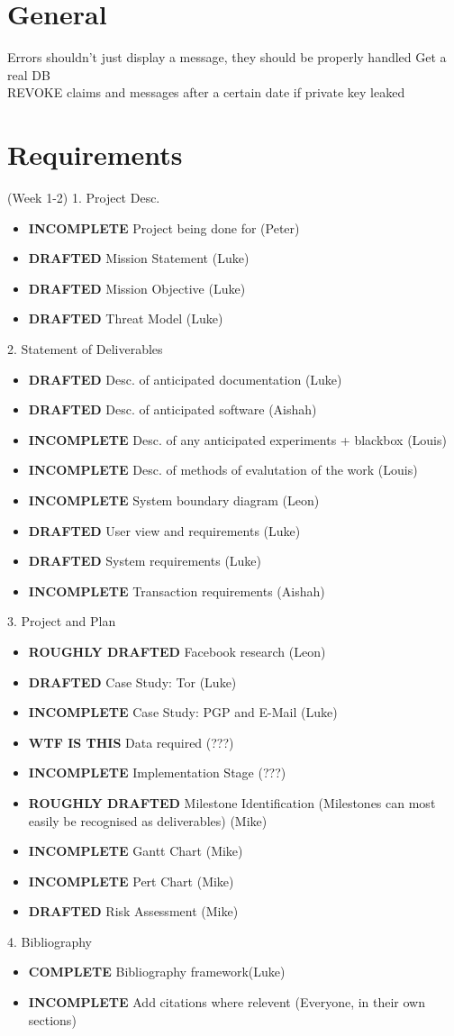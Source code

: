 \section{General}
Errors shouldn't just display a message, they should be properly handled
Get a real DB\\
REVOKE claims and messages after a certain date if private key leaked\\

\section{Requirements} (Week 1-2)
1. Project Desc.
\begin{itemize}
\item \textbf{INCOMPLETE} Project being done for (Peter)
\item \textbf{DRAFTED} Mission Statement (Luke)
\item \textbf{DRAFTED} Mission Objective (Luke)
\item \textbf{DRAFTED} Threat Model (Luke)
\end{itemize}

2. Statement of Deliverables
\begin{itemize}
\item \textbf{DRAFTED} Desc. of anticipated documentation (Luke)
\item \textbf{DRAFTED} Desc. of anticipated software (Aishah)
\item \textbf{INCOMPLETE} Desc. of any anticipated experiments + blackbox (Louis)
\item \textbf{INCOMPLETE} Desc. of methods of evalutation of the work (Louis)
\item \textbf{INCOMPLETE} System boundary diagram (Leon)
\item \textbf{DRAFTED} User view and requirements (Luke)
\item \textbf{DRAFTED} System requirements (Luke)
\item \textbf{INCOMPLETE} Transaction requirements (Aishah)
\end{itemize}

3. Project and Plan
\begin{itemize}
\item \textbf{ROUGHLY DRAFTED} Facebook research (Leon)
\item \textbf{DRAFTED} Case Study: Tor (Luke)
\item \textbf{INCOMPLETE} Case Study: PGP and E-Mail (Luke)
\item \textbf{WTF IS THIS} Data required (???)
\item \textbf{INCOMPLETE} Implementation Stage (???)
\item \textbf{ROUGHLY DRAFTED} Milestone Identification (Milestones can most easily be recognised as deliverables) (Mike)
\item \textbf{INCOMPLETE} Gantt Chart (Mike)
\item \textbf{INCOMPLETE} Pert Chart (Mike)
\item \textbf{DRAFTED} Risk Assessment (Mike)
\end{itemize}

4. Bibliography
\begin{itemize}
\item \textbf{COMPLETE} Bibliography framework(Luke)
\item \textbf{INCOMPLETE} Add citations where relevent (Everyone, in their own sections)
\end{itemize}
